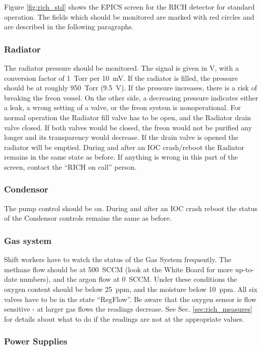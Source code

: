 {{Figure \ref{fig:rich_std} shows the EPICS screen for 
the RICH detector for standard operation. The fields which 
should be monitored are marked with red circles and are 
described in the following paragraphs.
}

\subsubsection{Radiator}

The radiator pressure should be monitored. The signal is given in V,
with a conversion factor of 1~Torr  
per 10~mV. If the radiator is filled, the pressure should be 
at roughly 950~Torr (9.5~V). If the pressure increases, there 
is a risk of breaking the freon vessel. On the other side, a decreasing
pressure indicates either a leak, a wrong setting of a valve, or 
the freon system is nonoperational.
For normal  operation the Radiator fill valve has to be open,
and the Radiator drain valve closed. If both valves would be closed,
the freon would not be purified any longer and its transparency
would decrease. If the drain valve is opened
the radiator will be emptied.
During and after an IOC crash/reboot the Radiator remains in the same
state as before. 
If anything is wrong in this part of the screen, contact 
the ``RICH on call'' person.

\subsubsection{Condensor}

The pump control should be on. During and after an IOC crash reboot the
status of the Condensor controls remains the same as before.

\subsubsection{Gas system}

Shift workers have to watch the status of the Gas System frequently.
The methane flow should be at 500~SCCM (look at the White Board for
more up-to-date numbers), and the argon flow at 0~SCCM.
Under these conditions the oxygen content should be below 25~ppm, and
the moisture below 10~ppm. All six valves have to be in the state ``RegFlow''.
Be aware that the oxygen sensor is flow sensitive - at 
larger gas flows the readings decrease. See Sec. \ref{sec:rich_measures} 
for details about what to do if the readings are not at the
appropriate values.

\subsubsection{Power Supplies}

}
